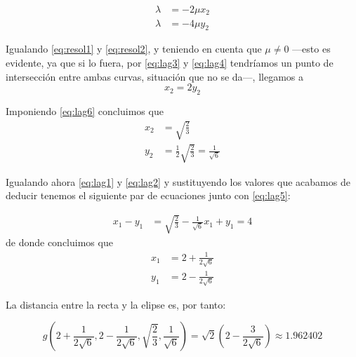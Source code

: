 \documentclass[a4paper, 11pt]{article}
\begin{document}
\begin{solucion}
        \begin{align}
            \lambda &= -2 \mu x_2 \label{eq:resol1} \\
            \lambda &= -4 \mu y_2 \label{eq:resol2}
        \end{align}

        Igualando \ref{eq:resol1} y \ref{eq:resol2}, y teniendo en cuenta que $\mu \neq 0$ ---esto es evidente, ya que si lo fuera, por \ref{eq:lag3} y \ref{eq:lag4} tendríamos un punto de intersección entre ambas curvas, situación que no se da---, llegamos a
        \[
        x_2 = 2y_2
        \]

        Imponiendo \ref{eq:lag6} concluimos que
        \begin{align}
            x_2 &= \sqrt{\frac{2}{3}} \label{eq:sol1} \\
            y_2 &= \frac{1}{2}\sqrt{\frac{2}{3}} = \frac{1}{\sqrt{6}} \label{eq:sol2}
        \end{align}

        Igualando ahora \ref{eq:lag1} y \ref{eq:lag2} y sustituyendo los valores que acabamos de deducir tenemos el siguiente par de ecuaciones junto con \ref{eq:lag5}:

        \begin{align*}
            x_1 - y_1 &= \sqrt{\frac{2}{3}} - \frac{1}{\sqrt{6}}
            x_1 + y_1 = 4
        \end{align*}
        de donde concluimos que
        \begin{align}
            x_1 &= 2 + \frac{1}{2\sqrt{6}} \\
            y_1 &= 2 - \frac{1}{2\sqrt{6}}
        \end{align}

        La distancia entre la recta y la elipse es, por tanto:

        \[
        g(2 + \frac{1}{2\sqrt{6}}, 2 - \frac{1}{2\sqrt{6}}, \sqrt{\frac{2}{3}}, \frac{1}{\sqrt{6}}) = \sqrt{2} \left(2 - \frac{3}{2\sqrt{6}}\right) \approx 1.962402
        \]

    \end{solucion}
\end{document}
